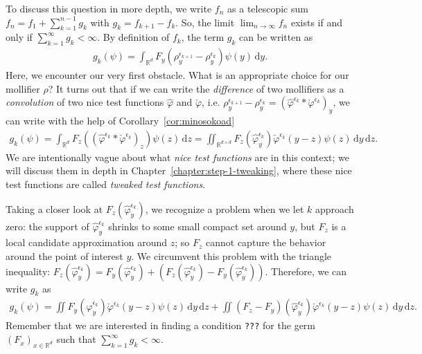 To discuss this question in more depth, we write \(f_n\) as a telescopic sum \(f_n = f_1 + \sum^{n-1}_{k=1}g_k\) with \(g_k = f_{k+1} - f_k\). So, the limit \(\lim_{n \to \infty} f_n\) exists if and only if \(\sum^\infty_{k=1}g_k < {\infty}\). By definition of \(f_{k}\), the term \(g_k\) can be written as  
\begin{align*}
        g_k(\psi) = \int_{\mathbb{R}^d} F_y(\rho_y^{\epsilon_{k+1}} - \rho_y^{\epsilon_k}) \psi(y)\, \mathrm{d}y.
\end{align*}
Here, we encounter our very first obstacle. What is an appropriate choice for our mollifier \( \rho \)? It turns out that if we can write the \emph{difference} of two mollifiers as a \emph{convolution} of two nice test functions \( \hat \varphi \) and \(\check {\varphi}\), i.e. \( \rho^{\epsilon_{k+1}}_y - \rho^{\epsilon_k}_y = {(\hat \varphi^{\epsilon_k} * \check \varphi^{\epsilon_k})}_y\), 
we can write with the help of Corollary~\ref{cor:minosokoad}
\begin{align*}
    g_k(\psi) = \int_{\mathbb{R}^d} F_z({(\hat \varphi^{\epsilon_k} * \check \varphi^{\epsilon_k})}_z) \psi(z)\, \mathrm{d}z
    = \iint_{\mathbb{R}^{d \times d}} F_z(\hat \varphi^{\epsilon_k}_y) \check \varphi^{\epsilon_k}(y-z) \psi(z) \, \mathrm{d}y\, \mathrm{d}z.
\end{align*}
We are intentionally vague about what \emph{nice test functions} are in this context; we will discuss them in depth in Chapter~\ref{chapter:step-1-tweaking}, where these nice test functions are called \emph{tweaked test functions}.

Taking a closer look at \(F_z(\hat \varphi^{\epsilon_k}_y)\), we recognize a problem when we let \(k\) approach zero: the support of \(\hat \varphi^{\epsilon_k}_y\) shrinks to some small compact set around \(y\), but \(F_z\) is a local candidate approximation around \(z\); so \(F_z\) cannot capture the behavior around the point of interest \(y\). We circumvent this problem with the triangle inequality: \(F_z(\hat \varphi^{\epsilon_k}_y) = F_y(\hat \varphi^{\epsilon_k}_y) + \left(F_z(\hat \varphi^{\epsilon_k}_y) - F_y(\hat \varphi^{\epsilon_k}_y)\right)\). 
Therefore, we can write \(g_k\) as 
\begin{align*}
        g_k(\psi) = \iint F_y(\hat \varphi^{\epsilon_k}_y) \check \varphi^{\epsilon_k}(y-z) \psi(z) \, \mathrm{d}y\, \mathrm{d}z 
        + \iint (F_z - F_y)(\hat \varphi^{\epsilon_k}_y) \check \varphi^{\epsilon_k}(y-z) \psi(z) \, \mathrm{d}y\, \mathrm{d}z .
\end{align*}
Remember that we are interested in finding a condition \texttt{???} for the germ \({(F_x)}_{x \in \mathbb{R}^d}\)  such that \(\sum^\infty_{k=1} g_k < {\infty}\). 

